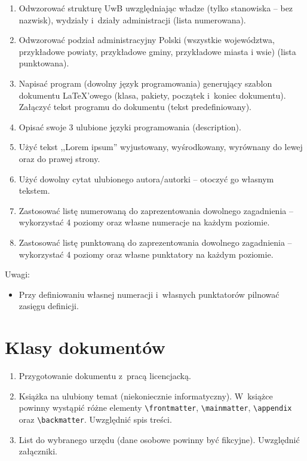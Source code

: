 \documentclass[a4paper,12pt]{article}
\begin{document}
\begin{enumerate}
    \item Odwzorować strukturę UwB uwzględniając władze (tylko stanowiska -- bez nazwisk), wydziały i~działy administracji (lista numerowana).
    \item Odwzorować podział administracyjny Polski (wszystkie województwa, przykładowe powiaty, przykładowe gminy, przykładowe miasta i wsie) (lista punktowana).
    \item Napisać program (dowolny język programowania) generujący szablon dokumentu \LaTeX'owego (klasa, pakiety, początek i~koniec dokumentu). Załączyć tekst programu do dokumentu (tekst predefiniowany).
    \item Opisać swoje 3 ulubione języki programowania (description).
    \item Użyć tekst ,,Lorem ipsum'' wyjustowany, wyśrodkowany, wyrównany do lewej oraz do prawej strony.
    \item Użyć dowolny cytat ulubionego autora/autorki -- otoczyć go własnym tekstem.
    \item Zastosować listę numerowaną do zaprezentowania dowolnego zagadnienia -- wykorzystać 4 poziomy oraz własne numeracje na każdym poziomie.
    \item Zastosować listę punktowaną do zaprezentowania dowolnego zagadnienia -- wykorzystać 4 poziomy oraz własne punktatory na każdym poziomie.
\end{enumerate}

Uwagi:

\begin{itemize}
    \item Przy definiowaniu własnej numeracji i~własnych punktatorów pilnować zasięgu definicji.
\end{itemize}

\section{Klasy dokumentów}

\begin{enumerate}
    \item Przygotowanie dokumentu z~pracą licencjacką.
    \item Książka na ulubiony temat (niekoniecznie informatyczny). W~książce powinny wystąpić różne elementy \verb!\frontmatter!, \verb!\mainmatter!, \verb!\appendix! oraz \verb!\backmatter!. Uwzględnić spis treści. 
    \item List do wybranego urzędu (dane osobowe powinny być fikcyjne). Uwzględnić załączniki.
\end{enumerate}
    
\end{document}
